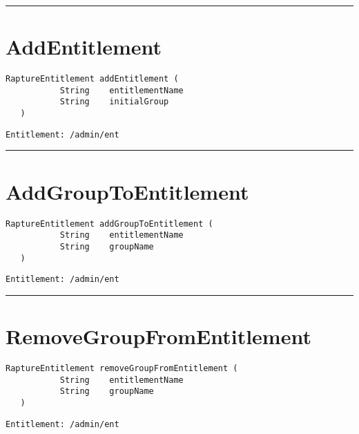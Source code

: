 \rule{12cm}{2pt}
\section{AddEntitlement}
\label{Api:AddEntitlement}
\begin{lstlisting}[style=nonumbers]
   RaptureEntitlement addEntitlement (
           String    entitlementName
           String    initialGroup
   )
\end{lstlisting}
\begin{Verbatim}[formatcom=\color{Maroon}]
  Entitlement: /admin/ent
\end{Verbatim}



\rule{12cm}{2pt}
\section{AddGroupToEntitlement}
\label{Api:AddGroupToEntitlement}
\begin{lstlisting}[style=nonumbers]
   RaptureEntitlement addGroupToEntitlement (
           String    entitlementName
           String    groupName
   )
\end{lstlisting}
\begin{Verbatim}[formatcom=\color{Maroon}]
  Entitlement: /admin/ent
\end{Verbatim}



\rule{12cm}{2pt}
\section{RemoveGroupFromEntitlement}
\label{Api:RemoveGroupFromEntitlement}
\begin{lstlisting}[style=nonumbers]
   RaptureEntitlement removeGroupFromEntitlement (
           String    entitlementName
           String    groupName
   )
\end{lstlisting}
\begin{Verbatim}[formatcom=\color{Maroon}]
  Entitlement: /admin/ent
\end{Verbatim}



